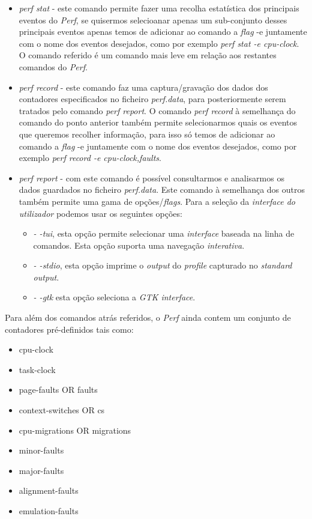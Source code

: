 \documentclass[conference,compsoc]{IEEEtran}
\begin{document}
\begin{itemize}
	\item \textit{perf stat} - este comando permite fazer uma recolha estatística dos principais eventos do \textit{Perf}, se quisermos selecioanar apenas um sub-conjunto desses principais eventos apenas temos de adicionar ao comando a \textit{flag} -e juntamente com o nome dos eventos desejados, como por exemplo \textit{perf stat -e cpu-clock}. O comando referido é um comando mais leve em relação aos restantes comandos do \textit{Perf}.
	\item \textit{perf record} - este comando faz uma captura/gravação dos dados dos contadores especificados no ficheiro \textit{perf.data}, para posteriormente serem tratados pelo comando \textit{perf report}. O comando \textit{perf record} à semelhança do comando do ponto anterior também permite selecionarmos quais os eventos que queremos recolher informação, para isso só temos de adicionar ao comando a \textit{flag} -e juntamente com o nome dos eventos desejados, como por exemplo \textit{perf record -e cpu-clock,faults}.
	\item \textit{perf report} - com este comando é possível consultarmos e analisarmos os dados guardados no ficheiro \textit{perf.data}. Este comando à semelhança dos outros também permite uma gama de opções/\textit{flags}. Para a seleção da \textit{interface do utilizador} podemos usar os seguintes opções:
	\begin{itemize}
		\item \textit{- -tui}, esta opção permite selecionar uma \textit{interface} baseada na linha de comandos. Esta opção suporta uma navegação \textit{interativa}.
		\item \textit{- -stdio}, esta opção imprime o \textit{output} do \textit{profile} capturado no \textit{standard output}.
		\item \textit{- -gtk} esta opção seleciona a \textit{GTK interface}. 
	\end{itemize}
\end{itemize}

Para além dos comandos atrás referidos, o \textit{Perf} ainda contem um conjunto de contadores pré-definidos tais como:
\begin{itemize}
	\item cpu-clock
	\item task-clock
	\item page-faults OR faults
	\item context-switches OR cs
	\item cpu-migrations OR migrations
	\item minor-faults
	\item major-faults
	\item alignment-faults
	\item emulation-faults
\end{itemize}
\end{document}
